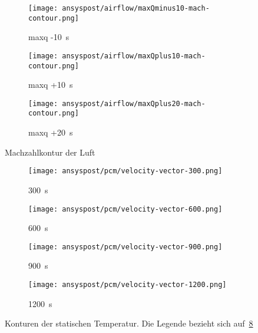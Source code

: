\begin{figure}[H]
    \centering

    \begin{subfigure}{\textwidth}
        \centering
        \texttt{[image: ansyspost/airflow/maxQminus10-mach-contour.png]}
        \caption{\ac{maxq} -\SI{10}{\second}}
        \label{fig:maxQminus10_mach_contour}
    \end{subfigure}

    \begin{subfigure}{\textwidth}
        \centering
        \texttt{[image: ansyspost/airflow/maxQplus10-mach-contour.png]}
        \caption{\ac{maxq} +\SI{10}{\second}}
        \label{fig:maxQplus10_mach_contour}
    \end{subfigure}

    \begin{subfigure}{\textwidth}
        \centering
        \texttt{[image: ansyspost/airflow/maxQplus20-mach-contour.png]}
        \caption{\ac{maxq} +\SI{20}{\second}}
        \label{fig:maxQplus20_mach_contour}
    \end{subfigure}

    \caption{Machzahlkontur der Luft}
    \label{fig:airflow_mach_contour_continued}
\end{figure}

\begin{figure}[H]
    \centering

    \begin{subfigure}[t]{0.14\textwidth}
        \centering
    \end{subfigure}%
    \hspace{2mm}%
    \begin{subfigure}[t]{0.2\textwidth}
        \centering
        \texttt{[image: ansyspost/pcm/velocity-vector-300.png]}
        \caption{\SI{300}{\second}}\label{fig:velocity_vector_300}
    \end{subfigure}%
    \begin{subfigure}[t]{0.2\textwidth}
        \centering
        \texttt{[image: ansyspost/pcm/velocity-vector-600.png]}
        \caption{\SI{600}{\second}}\label{fig:velocity_vector_600}
    \end{subfigure}%
    \begin{subfigure}[t]{0.2\textwidth}
        \centering
        \texttt{[image: ansyspost/pcm/velocity-vector-900.png]}
        \caption{\SI{900}{\second}}\label{fig:velocity_vector_900}
    \end{subfigure}%
    \begin{subfigure}[t]{0.2\textwidth}
        \centering
        \texttt{[image: ansyspost/pcm/velocity-vector-1200.png]}
        \caption{\SI{1200}{\second}}\label{fig:velocity_vector_1200}
    \end{subfigure}
    \caption{Konturen der statischen Temperatur. Die Legende bezieht sich auf~\ref{fig:velocity_vector_1200}}\label{fig:pcm_static_temperature_kontur}
\end{figure}